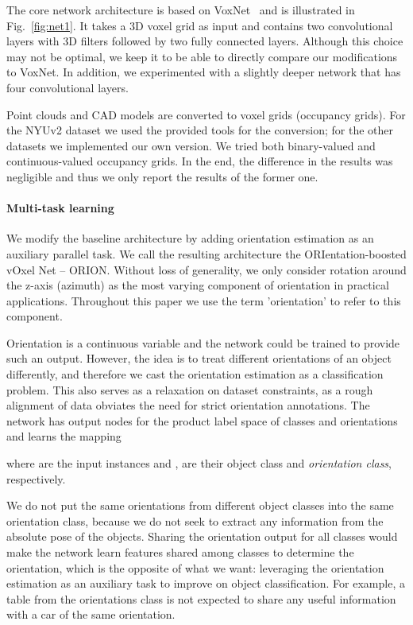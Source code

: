 \documentclass{bmvc2k}
\begin{document}
The core network architecture is based on VoxNet~\cite{maturana_voxnet_2015} and is illustrated in Fig.~\ref{fig:net1}. It takes a 3D voxel grid as input and contains two convolutional layers with 3D filters followed by two fully connected layers. Although this choice may not be optimal, we keep it to be able to directly compare our modifications to VoxNet. In addition, we experimented with a slightly deeper network that has four convolutional layers. 

Point clouds and CAD models are converted to voxel grids (occupancy grids). For the NYUv2 dataset we used the provided tools for the conversion; for the other datasets we implemented our own version. We tried both binary-valued and continuous-valued occupancy grids. In the end, the difference in the results was negligible and thus we only report the results of the former one.

\paragraph{Multi-task learning}We modify the baseline architecture by adding orientation estimation as an auxiliary parallel task. We call the resulting architecture the ORIentation-boosted vOxel Net -- ORION. Without loss of generality, we only consider rotation around the z-axis (azimuth) as the most varying component of orientation in practical applications. Throughout this paper we use the term 'orientation' to refer to this component.

Orientation is a continuous variable and the network could be trained to provide such an output. However, the idea is to treat different orientations of an object differently, and therefore we cast the orientation estimation as a classification problem. This also serves as a relaxation on dataset constraints, as a rough alignment of data obviates the need for strict orientation annotations. The network has output nodes for the product label space of classes and orientations and learns the mapping


\noindent where  are the input instances and  ,  are their object class and \textit{orientation class}, respectively.

We do not put the same orientations from different object classes into the same orientation class, because we do not seek to extract any information from the absolute pose of the objects. Sharing the orientation output for all classes would make the network learn features shared among classes to determine the orientation, which is the opposite of what we want: leveraging the orientation estimation as an auxiliary task to improve on object classification. For example, a table from the  orientations class is not expected to share any useful information with a car of the same orientation. 
\end{document}
